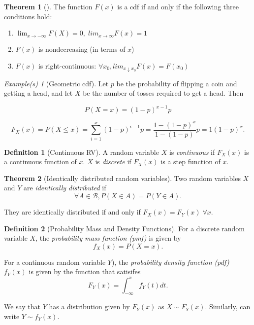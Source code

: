 \documentclass[12pt, letterpaper]{article}
\theoremstyle{definition}
\newtheorem*{defn}{Definition}
\newtheorem*{thm}{Theorem}
\theoremstyle{remark}
\newtheorem*{eg}{Example(s)}
\begin{document}
\begin{thm}[]
    The function \(F(x)\) is a cdf if and only if the following three conditions hold:
    \begin{enumerate}
        \item \(\lim_{x \rightarrow - \infty} F(X) = 0, \; lim_{x \rightarrow \infty} F(x) = 1\)
        \item \(F(x)\) is nondecreasing (in terms of \(x\))
        \item \(F(x)\) is right-continuous: \(\forall x_0, lim_{x \downarrow x_0} F(x) = F(x_0)\)
    \end{enumerate}
    
\end{thm}

\begin{eg}[Geometric cdf]
    Let \(p\) be the probability of flipping a coin and getting a head, and let \(X\) be the number of tosses required to get a head. Then

    \[P(X = x) = (1-p)^{x-1}p\]

    \[F_X(x) = P(X \leq x) = \sum_{i = 1}^{x} (1-p)^{i-1}p = \frac{1 - (1-p)^x}{1-(1-p)}p = 1(1-p)^x.\]
\end{eg}

\begin{defn}[Continuous RV]
    A random variable \(X\) is \textit{continuous} if \(F_X(x)\) is a continuous function of \(x\). \(X\) is \textit{discrete} if \(F_X(x)\) is a step function of \(x\).
\end{defn}

\begin{thm}[Identically distributed random variables]
    Two random variables \(X\) and \(Y\) are \textit{identically distributed} if
    \[\forall A \in \mathcal{B}, P(X \in A) = P(Y \in A).\]

    They are identically distributed if and only if \(F_X(x) = F_Y(x) \; \forall x.\)
\end{thm}

\begin{defn}[Probability Mass and Density Functions]
    For a discrete random variable \(X\), the \textit{probability mass function (pmf)} is given by
    \[f_X(x) = P(X=x).\]

    For a continuous random variable \(Y\)), the \textit{probability density function (pdf)} \(f_Y(x)\) is given by the function that satisifes
    \[F_Y(x) = \int_{- \infty}^{x} f_Y(t) dt.\]

    We say that \(Y\) has a distribution given by \(F_Y(x)\) as \(X \sim F_Y(x)\). Similarly, can write \(Y \sim f_Y(x)\).
\end{defn}
\end{document}
